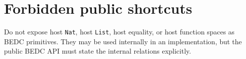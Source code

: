 \section{Forbidden public shortcuts}

Do not expose host \texttt{Nat}, host \texttt{List}, host equality, or host function spaces as BEDC primitives.  They may be used internally in an implementation, but the public BEDC API must state the internal relations explicitly.
